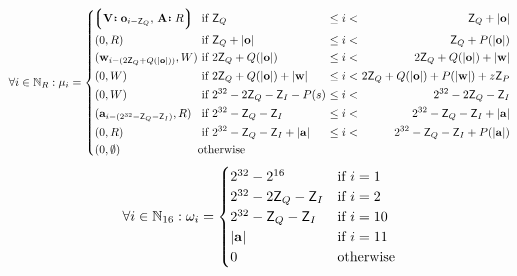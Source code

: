 \begin{equation}\label{eq:memlayout}
  \forall i \in \N_R : \mem_i = \left\{\begin{alignedat}{5}
    &\tup{\is{\mathbf{V}}{\mathbf{o}_{i - \mathsf{Z}_Q}}\ts\is{\mathbf{A}}{R}} &&\ \when
        \mathsf{Z}_Q
            &\ \leq i < \ &&
                \mathsf{Z}_Q + |\mathbf{o}|\\
    &(0, R) &&\ \when
        \mathsf{Z}_Q + |\mathbf{o}|
            &\ \leq i < \ &&
                \mathsf{Z}_Q + \rnp{|\mathbf{o}|} \\
    &(\mathbf{w}_{i - (2\mathsf{Z}_Q + \rnq{|\mathbf{o}|})}, W) &&\ \when
        2\mathsf{Z}_Q + \rnq{|\mathbf{o}|}
            &\ \leq i < \ &&
                2\mathsf{Z}_Q + \rnq{|\mathbf{o}|} + |\mathbf{w}|\\
    &(0, W) &&\ \when
        2\mathsf{Z}_Q + \rnq{|\mathbf{o}|} + |\mathbf{w}|
            &\ \leq i < \ &&
                2\mathsf{Z}_Q + \rnq{|\mathbf{o}|} + \rnp{|\mathbf{w}|} + z\mathsf{Z}_P\\
    &(0, W) &&\ \when
        2^{32} - 2\mathsf{Z}_Q - \mathsf{Z}_I - \rnp{s}
            &\ \leq i < \ &&
                2^{32} - 2\mathsf{Z}_Q - \mathsf{Z}_I\\
    &(\mathbf{a}_{i - (2^{32} - \mathsf{Z}_Q - \mathsf{Z}_I)}, R) &&\ \when
        2^{32} - \mathsf{Z}_Q - \mathsf{Z}_I
            &\ \leq i < \ &&
                2^{32} - \mathsf{Z}_Q - \mathsf{Z}_I + |\mathbf{a}|\\
    &(0, R) &&\ \when
        2^{32} - \mathsf{Z}_Q - \mathsf{Z}_I + |\mathbf{a}|
            &\ \leq i < \ &&
                2^{32} - \mathsf{Z}_Q - \mathsf{Z}_I + \rnp{|\mathbf{a}|}\\
    &(0, \none) &&\otherwise&&&
  \end{alignedat}\right.\\
\end{equation}
\begin{equation}\label{eq:registers}
  \forall i \in \mathbb{N}_{16} : \omega_i = \begin{cases}
      2^{32} - 2^{16} &\text{if } i = 1\\
      2^{32} - 2\mathsf{Z}_Q - \mathsf{Z}_I &\text{if } i = 2\\
      2^{32} - \mathsf{Z}_Q - \mathsf{Z}_I &\text{if } i = 10\\
      |\mathbf{a}|&\text{if } i = 11\\
      0 &\text{otherwise}
    \end{cases}
\end{equation}


